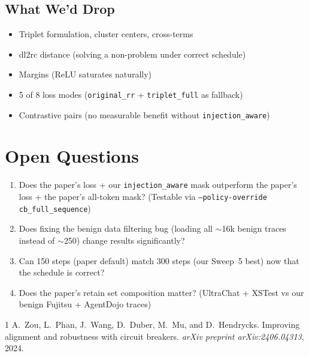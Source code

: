 \documentclass[11pt]{article}
\begin{document}
\subsection{What We'd Drop}

\begin{itemize}
  \item Triplet formulation, cluster centers, cross-terms
  \item dl2rc distance (solving a non-problem under correct schedule)
  \item Margins (ReLU saturates naturally)
  \item 5 of 8 loss modes (\texttt{original\_rr} + \texttt{triplet\_full} as fallback)
  \item Contrastive pairs (no measurable benefit without \texttt{injection\_aware})
\end{itemize}

\section{Open Questions}

\begin{enumerate}
  \item Does the paper's loss + our \texttt{injection\_aware} mask outperform
        the paper's loss + the paper's all-token mask? (Testable via
        \texttt{--policy-override cb\_full\_sequence})
  \item Does fixing the benign data filtering bug (loading all $\sim$16k benign
        traces instead of $\sim$250) change results significantly?
  \item Can 150 steps (paper default) match 300 steps (our Sweep~5 best) now
        that the schedule is correct?
  \item Does the paper's retain set composition matter? (UltraChat + XSTest vs
        our benign Fujitsu + AgentDojo traces)
\end{enumerate}

\begin{thebibliography}{1}
A.~Zou, L.~Phan, J.~Wang, D.~Duber, M.~Mu, and D.~Hendrycks.
\newblock Improving alignment and robustness with circuit breakers.
\newblock \emph{arXiv preprint arXiv:2406.04313}, 2024.
\end{thebibliography}
\end{document}
